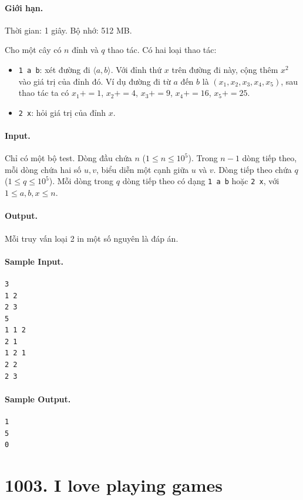 \documentclass[11pt]{article}
\begin{document}
\paragraph{Giới hạn.} Thời gian: 1 giây. Bộ nhớ: 512 MB.

Cho một cây có $n$ đỉnh và $q$ thao tác.  Có hai loại thao tác:
\begin{itemize}
  \item \texttt{1 a b}: xét đường đi $\langle a,b\rangle$.  Với đỉnh thứ $x$
  trên đường đi này, cộng thêm $x^2$ vào giá trị của đỉnh đó.  Ví dụ đường đi
  từ $a$ đến $b$ là $(x_1,x_2,x_3,x_4,x_5)$, sau thao tác ta có
  $x_1{+}=1$, $x_2{+}=4$, $x_3{+}=9$, $x_4{+}=16$, $x_5{+}=25$.
  \item \texttt{2 x}: hỏi giá trị của đỉnh $x$.
\end{itemize}

\paragraph{Input.}
Chỉ có một bộ test.  Dòng đầu chứa $n$ ($1\le n\le 10^5$).  Trong $n-1$ dòng
tiếp theo, mỗi dòng chứa hai số $u,v$, biểu diễn một cạnh giữa $u$ và $v$.
Dòng tiếp theo chứa $q$ ($1\le q\le 10^5$).  Mỗi dòng trong $q$ dòng tiếp theo
có dạng \texttt{1 a b} hoặc \texttt{2 x}, với $1\le a,b,x\le n$.

\paragraph{Output.}
Mỗi truy vấn loại 2 in một số nguyên là đáp án.

\paragraph{Sample Input.}
\begin{verbatim}
3
1 2
2 3
5
1 1 2
2 1
1 2 1
2 2
2 3
\end{verbatim}

\paragraph{Sample Output.}
\begin{verbatim}
1
5
0
\end{verbatim}

\section{1003. I love playing games}
\end{document}
